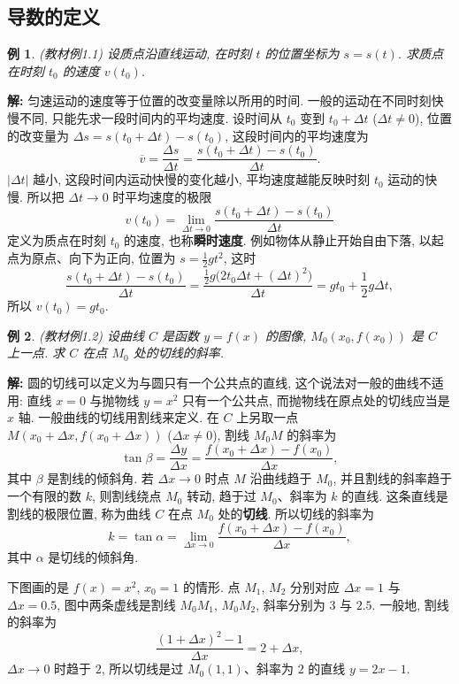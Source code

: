 \documentclass[UTF8,openany]{ctexbook}
\theoremstyle{chinesetextbook}
\newtheorem{example}{例}[section]
\newenvironment{cnsolution}{\par\indent\textbf{解:} \ignorespaces}{\par}
\begin{document}
\subsection{导数的定义}
\begin{example}\label{ex:c2-1-1}
\textnormal{(教材例1.1)} 设质点沿直线运动, 在时刻 $t$ 的位置坐标为 $s=s(t)$. 求质点在时刻 $t_0$ 的速度 $v(t_0)$.
\end{example}
\begin{cnsolution}
匀速运动的速度等于位置的改变量除以所用的时间. 一般的运动在不同时刻快慢不同, 只能先求一段时间内的平均速度. 设时间从 $t_0$ 变到 $t_0+\Delta t$ ($\Delta t\ne0$), 位置的改变量为 $\Delta s=s(t_0+\Delta t)-s(t_0)$, 这段时间内的平均速度为
\[
\overline v=\frac{\Delta s}{\Delta t}=\frac{s(t_0+\Delta t)-s(t_0)}{\Delta t}.
\]
$|\Delta t|$ 越小, 这段时间内运动快慢的变化越小, 平均速度越能反映时刻 $t_0$ 运动的快慢. 所以把 $\Delta t\to0$ 时平均速度的极限
\[
v(t_0)=\lim_{\Delta t\to0}\frac{s(t_0+\Delta t)-s(t_0)}{\Delta t}
\]
定义为质点在时刻 $t_0$ 的速度, 也称\textbf{瞬时速度}. 例如物体从静止开始自由下落, 以起点为原点、向下为正向, 位置为 $\displaystyle s=\frac12gt^2$, 这时
\[
\frac{s(t_0+\Delta t)-s(t_0)}{\Delta t}=\frac{\frac12g\bigl(2t_0\Delta t+(\Delta t)^2\bigr)}{\Delta t}=gt_0+\frac12g\Delta t,
\]
所以 $v(t_0)=gt_0$.
\end{cnsolution}
\begin{example}\label{ex:c2-1-2}
\textnormal{(教材例1.2)} 设曲线 $C$ 是函数 $y=f(x)$ 的图像, $M_0(x_0,f(x_0))$ 是 $C$ 上一点. 求 $C$ 在点 $M_0$ 处的切线的斜率.
\end{example}
\begin{cnsolution}
圆的切线可以定义为与圆只有一个公共点的直线, 这个说法对一般的曲线不适用: 直线 $x=0$ 与抛物线 $y=x^2$ 只有一个公共点, 而抛物线在原点处的切线应当是 $x$ 轴. 一般曲线的切线用割线来定义. 在 $C$ 上另取一点 $M(x_0+\Delta x,f(x_0+\Delta x))$ ($\Delta x\ne0$), 割线 $M_0M$ 的斜率为
\[
\tan\beta=\frac{\Delta y}{\Delta x}=\frac{f(x_0+\Delta x)-f(x_0)}{\Delta x},
\]
其中 $\beta$ 是割线的倾斜角. 若 $\Delta x\to0$ 时点 $M$ 沿曲线趋于 $M_0$, 并且割线的斜率趋于一个有限的数 $k$, 则割线绕点 $M_0$ 转动, 趋于过 $M_0$、斜率为 $k$ 的直线. 这条直线是割线的极限位置, 称为曲线 $C$ 在点 $M_0$ 处的\textbf{切线}. 所以切线的斜率为
\[
k=\tan\alpha=\lim_{\Delta x\to0}\frac{f(x_0+\Delta x)-f(x_0)}{\Delta x},
\]
其中 $\alpha$ 是切线的倾斜角.

下图画的是 $f(x)=x^2$, $x_0=1$ 的情形. 点 $M_1$, $M_2$ 分别对应 $\Delta x=1$ 与 $\Delta x=0.5$, 图中两条虚线是割线 $M_0M_1$, $M_0M_2$, 斜率分别为 $3$ 与 $2.5$. 一般地, 割线的斜率为
\[
\frac{(1+\Delta x)^2-1}{\Delta x}=2+\Delta x,
\]
$\Delta x\to0$ 时趋于 $2$, 所以切线是过 $M_0(1,1)$、斜率为 $2$ 的直线 $y=2x-1$.
\end{cnsolution}
\end{document}
